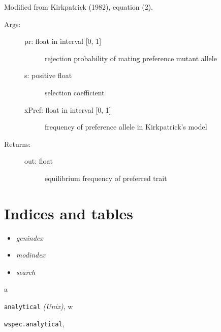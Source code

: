 \documentclass[letterpaper,10pt,english]{sphinxmanual}
\begin{document}
\begin{fulllineitems}
\label{index:wspec.analytical.xTprefEQ}
Modified from Kirkpatrick (1982), equation (2).
\begin{description}
\item[{Args:}] \leavevmode\begin{description}
\item[{pr: float in interval {[}0, 1{]}}] \leavevmode
rejection probability of mating preference mutant allele

\item[{s: positive float}] \leavevmode
selection coefficient

\item[{xPref: float in interval {[}0, 1{]}}] \leavevmode
frequency of preference allele in Kirkpatrick's model

\end{description}

\item[{Returns:}] \leavevmode\begin{description}
\item[{out: float}] \leavevmode
equilibrium frequency of preferred trait

\end{description}

\end{description}

\end{fulllineitems}



\chapter{Indices and tables}
\label{index:indices-and-tables}\begin{itemize}
\item {} 
\emph{genindex}

\item {} 
\emph{modindex}

\item {} 
\emph{search}

\end{itemize}


\renewcommand{\indexname}{Python Module Index}
\begin{theindex}
\def\bigletter#1{{\Large\sffamily#1}\nopagebreak\vspace{1mm}}
\bigletter{a}
\item {\texttt{analytical}} \emph{(Unix)}, \pageref{index:module-analytical}
\indexspace
\bigletter{w}
\item {\texttt{wspec.analytical}}, \pageref{index:module-wspec.analytical}
\end{theindex}

\renewcommand{\indexname}{Index}
\printindex
\end{document}
